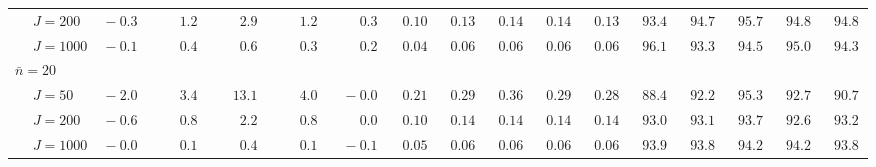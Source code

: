 \begin{sidewaystable}
\begin{threeparttable}
\begin{tabular}{llccccccccccccccc}
 & \nopagebreak $\;J=200$  & $\phantom{0}{-}0.3\phantom{0}$ & $\phantom{0}\phantom{-}1.2\phantom{0}$ & $\phantom{0}\phantom{-}2.9\phantom{0}$ & $\phantom{0}\phantom{-}1.2\phantom{0}$ & $\phantom{0}\phantom{-}0.3\phantom{0}$ & $\phantom{0}0.10\phantom{0}$ & $\phantom{0}0.13\phantom{0}$ & $\phantom{0}0.14\phantom{0}$ & $\phantom{0}0.14\phantom{0}$ & $\phantom{0}0.13\phantom{0}$ & $\phantom{0}93.4\phantom{0}$ & $\phantom{0}94.7\phantom{0}$ & $\phantom{0}95.7\phantom{0}$ & $\phantom{0}94.8\phantom{0}$ & $\phantom{0}94.8\phantom{0}$ \\
 & \nopagebreak $\;J=1000$  & $\phantom{0}{-}0.1\phantom{0}$ & $\phantom{0}\phantom{-}0.4\phantom{0}$ & $\phantom{0}\phantom{-}0.6\phantom{0}$ & $\phantom{0}\phantom{-}0.3\phantom{0}$ & $\phantom{0}\phantom{-}0.2\phantom{0}$ & $\phantom{0}0.04\phantom{0}$ & $\phantom{0}0.06\phantom{0}$ & $\phantom{0}0.06\phantom{0}$ & $\phantom{0}0.06\phantom{0}$ & $\phantom{0}0.06\phantom{0}$ & $\phantom{0}96.1\phantom{0}$ & $\phantom{0}93.3\phantom{0}$ & $\phantom{0}94.5\phantom{0}$ & $\phantom{0}95.0\phantom{0}$ & $\phantom{0}94.3\phantom{0}$ \\
\multicolumn{4}{l}{$\bar{n}=20$} \\  & \nopagebreak $\;J=50$  & $\phantom{0}{-}2.0\phantom{0}$ & $\phantom{0}\phantom{-}3.4\phantom{0}$ & $\phantom{-}13.1\phantom{0}$ & $\phantom{0}\phantom{-}4.0\phantom{0}$ & $\phantom{0}{-}0.0\phantom{0}$ & $\phantom{0}0.21\phantom{0}$ & $\phantom{0}0.29\phantom{0}$ & $\phantom{0}0.36\phantom{0}$ & $\phantom{0}0.29\phantom{0}$ & $\phantom{0}0.28\phantom{0}$ & $\phantom{0}88.4\phantom{0}$ & $\phantom{0}92.2\phantom{0}$ & $\phantom{0}95.3\phantom{0}$ & $\phantom{0}92.7\phantom{0}$ & $\phantom{0}90.7\phantom{0}$ \\
 & \nopagebreak $\;J=200$  & $\phantom{0}{-}0.6\phantom{0}$ & $\phantom{0}\phantom{-}0.8\phantom{0}$ & $\phantom{0}\phantom{-}2.2\phantom{0}$ & $\phantom{0}\phantom{-}0.8\phantom{0}$ & $\phantom{0}\phantom{-}0.0\phantom{0}$ & $\phantom{0}0.10\phantom{0}$ & $\phantom{0}0.14\phantom{0}$ & $\phantom{0}0.14\phantom{0}$ & $\phantom{0}0.14\phantom{0}$ & $\phantom{0}0.14\phantom{0}$ & $\phantom{0}93.0\phantom{0}$ & $\phantom{0}93.1\phantom{0}$ & $\phantom{0}93.7\phantom{0}$ & $\phantom{0}92.6\phantom{0}$ & $\phantom{0}93.2\phantom{0}$ \\
 & \nopagebreak $\;J=1000$  & $\phantom{0}{-}0.0\phantom{0}$ & $\phantom{0}\phantom{-}0.1\phantom{0}$ & $\phantom{0}\phantom{-}0.4\phantom{0}$ & $\phantom{0}\phantom{-}0.1\phantom{0}$ & $\phantom{0}{-}0.1\phantom{0}$ & $\phantom{0}0.05\phantom{0}$ & $\phantom{0}0.06\phantom{0}$ & $\phantom{0}0.06\phantom{0}$ & $\phantom{0}0.06\phantom{0}$ & $\phantom{0}0.06\phantom{0}$ & $\phantom{0}93.9\phantom{0}$ & $\phantom{0}93.8\phantom{0}$ & $\phantom{0}94.2\phantom{0}$ & $\phantom{0}94.2\phantom{0}$ & $\phantom{0}93.8\phantom{0}$ \\

\end{tabular}
\end{threeparttable}
\end{sidewaystable}
